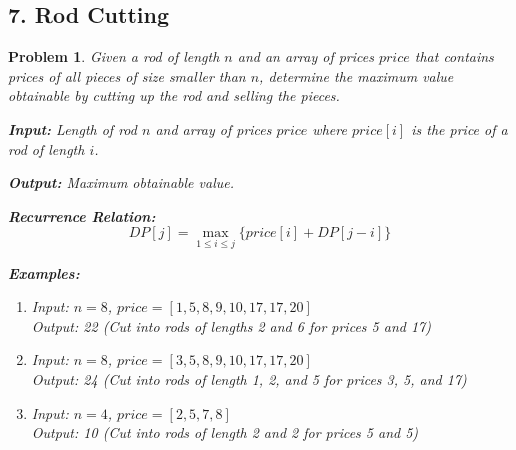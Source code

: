\documentclass{article}
\newtheorem{problem}{Problem}
\begin{document}
\subsection*{7. Rod Cutting}
\begin{problem}
Given a rod of length $n$ and an array of prices $price$ that contains prices of all pieces of size smaller than $n$, determine the maximum value obtainable by cutting up the rod and selling the pieces.

\textbf{Input:} Length of rod $n$ and array of prices $price$ where $price[i]$ is the price of a rod of length $i$.

\textbf{Output:} Maximum obtainable value.

\textbf{Recurrence Relation:}
\[
DP[j] = \max_{1 \leq i \leq j} \{price[i] + DP[j-i]\}
\]

\textbf{Examples:}
\begin{enumerate}
\item Input: $n = 8$, $price = [1, 5, 8, 9, 10, 17, 17, 20]$ \\
      Output: 22 (Cut into rods of lengths 2 and 6 for prices 5 and 17)
\item Input: $n = 8$, $price = [3, 5, 8, 9, 10, 17, 17, 20]$ \\
      Output: 24 (Cut into rods of length 1, 2, and 5 for prices 3, 5, and 17)
\item Input: $n = 4$, $price = [2, 5, 7, 8]$ \\
      Output: 10 (Cut into rods of length 2 and 2 for prices 5 and 5)
\end{enumerate}
\end{problem}

\end{document}
